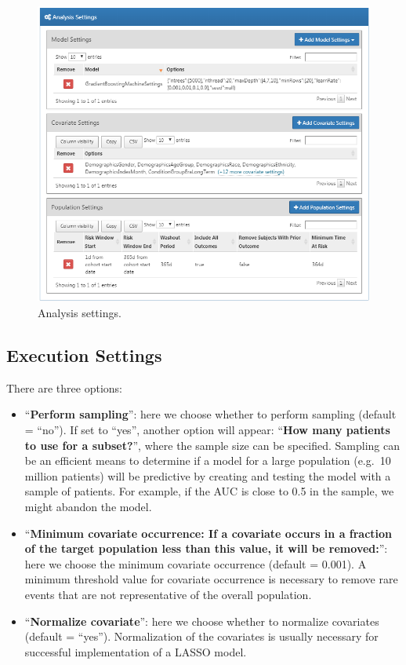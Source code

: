 \documentclass[11pt]{book}
\providecommand{\tightlist}{%
  \setlength{\itemsep}{0pt}\setlength{\parskip}{0pt}}
\theoremstyle{definition}
\theoremstyle{definition}
\theoremstyle{definition}
\theoremstyle{remark}
\begin{document}
\begin{figure}

{\centering \includegraphics[width=1\linewidth]{images/PatientLevelPrediction/analysisSettings} 

}

\caption{Analysis settings.}\label{fig:analysisSettings}
\end{figure}

\subsection{Execution Settings}\label{execution-settings}

There are three options:

\begin{itemize}
\tightlist
\item
  ``\textbf{Perform sampling}'': here we choose whether to perform
  sampling (default = ``no''). If set to ``yes'', another option will
  appear: ``\textbf{How many patients to use for a subset?}'', where the
  sample size can be specified. Sampling can be an efficient means to
  determine if a model for a large population (e.g.~10 million patients)
  will be predictive by creating and testing the model with a sample of
  patients. For example, if the AUC is close to 0.5 in the sample, we
  might abandon the model.
\item
  ``\textbf{Minimum covariate occurrence: If a covariate occurs in a
  fraction of the target population less than this value, it will be
  removed:}'': here we choose the minimum covariate occurrence (default
  = 0.001). A minimum threshold value for covariate occurrence is
  necessary to remove rare events that are not representative of the
  overall population.
\item
  ``\textbf{Normalize covariate}'': here we choose whether to normalize
  covariates (default = ``yes''). Normalization of the covariates is
  usually necessary for successful implementation of a LASSO model.
\end{itemize}
\end{document}
